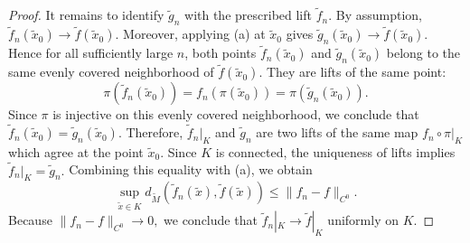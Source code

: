 \documentclass[11pt]{article}
\theoremstyle{definition}
\begin{document}
\begin{proof}
		It remains to identify $\widetilde g_n$ with the prescribed lift $\widetilde
		f_n$. By assumption, $\widetilde f_n(\tilde x_0) \longrightarrow \widetilde
		f(\tilde x_0).$ Moreover, applying (a) at $\tilde x_0$ gives $\widetilde
		g_n(\tilde x_0) \longrightarrow \widetilde f(\tilde x_0).$ Hence for all
		sufficiently large $n$, both points $\widetilde f_n(\tilde x_0)$ and
		$\widetilde g_n(\tilde x_0)$ belong to the same evenly covered neighborhood of
		$\widetilde f(\tilde x_0)$. They are lifts of the same point:
		\[
		\pi(\widetilde f_n(\tilde x_0)) = f_n(\pi(\tilde x_0)) =
		\pi(\widetilde g_n(\tilde x_0)).
		\]
		Since $\pi$ is injective on this evenly covered neighborhood, we conclude that
		$\widetilde f_n(\tilde x_0) = \widetilde g_n(\tilde x_0).$ Therefore,
		$\widetilde f_n|_K$ and $\widetilde g_n$ are two lifts of the same map
		$f_n\circ\pi|_K$ which agree at the point $\tilde x_0$. Since $K$ is connected,
		the uniqueness of lifts implies $\widetilde f_n|_K = \widetilde g_n.$ Combining
		this equality with (a), we obtain
		\[
		\sup_{\tilde x\in K} d_{\widetilde M} (\widetilde f_n(\tilde x),\widetilde
		f(\tilde x)) \le \|f_n-f\|_{C^0}.
		\]
		Because $\|f_n-f\|_{C^0}\longrightarrow0,$ we conclude that $\widetilde f_n|_K
		\longrightarrow \widetilde f|_K$ uniformly on $K$.
	\end{proof}
	
\end{document}
